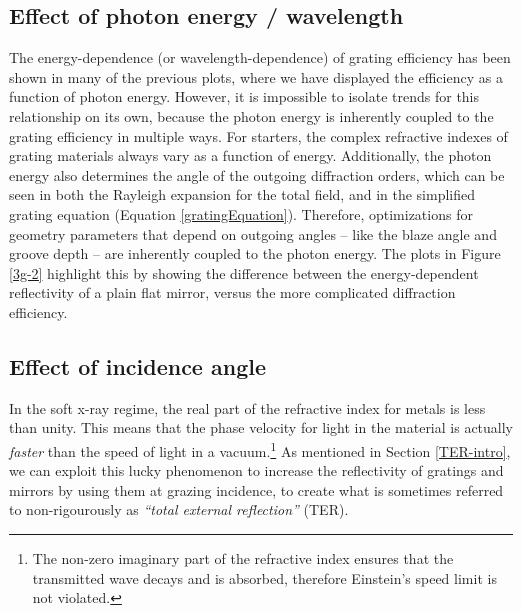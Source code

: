 \subsection{Effect of photon energy / wavelength}
The energy-dependence (or wavelength-dependence) of grating efficiency has been shown in many of the previous plots, where we have displayed the efficiency as a function of photon energy.  However, it is impossible to isolate trends for this relationship on its own, because the photon energy is inherently coupled to the grating efficiency in multiple ways.  For starters, the complex refractive indexes of grating materials always vary as a function of energy.  Additionally, the photon energy also determines the angle of the outgoing diffraction orders, which can be seen in both the Rayleigh expansion for the total field, and in the simplified grating equation (Equation \ref{gratingEquation}).  Therefore, optimizations for geometry parameters that depend on outgoing angles -- like the blaze angle and groove depth -- are inherently coupled to the photon energy.  The plots in Figure \ref{3g-2} highlight this by showing the difference between the energy-dependent reflectivity of a plain flat mirror, versus the more complicated diffraction efficiency.

\subsection{Effect of incidence angle}
\label{TER}
In the soft x-ray regime, the real part of the refractive index for metals is less than unity.  This means that the phase velocity for light in the material is actually \emph{faster} than the speed of light in a vacuum.\footnote{The non-zero imaginary part of the refractive index ensures that the transmitted wave decays and is absorbed, therefore Einstein's speed limit is not violated.}  As mentioned in Section \ref{TER-intro}, we can exploit this lucky phenomenon to increase the reflectivity of gratings and mirrors by using them at grazing incidence, to create what is sometimes referred to non-rigourously as \emph{``total external reflection''} (TER).

